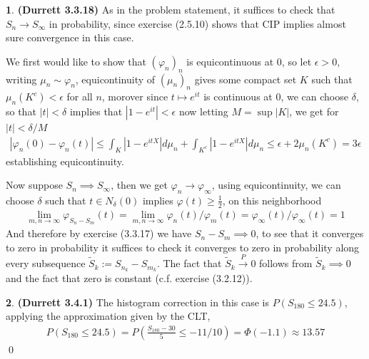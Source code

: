 \documentclass{article}
\theoremstyle{definition}
\newtheorem{pb}{}
\newcommand{\abs}[1]{\left\vert#1\right\vert}
\begin{document}
    \begin{pb}\textbf{(Durrett 3.3.18)}
        As in the problem statement, it suffices to check that \(S_n \to S_\infty\) in probability, since exercise (2.5.10) shows that CIP implies almost sure convergence in this case.

        We first would like to show that \((\varphi_n)_n\) is equicontinuous at \(0\), so let \(\epsilon > 0\), writing \(\mu_n \sim \varphi_n\), equicontinuity of \((\mu_n)_n\) gives some compact set \(K\) such that \(\mu_n(K^c) < \epsilon\) for all \(n\), morover since \(t \mapsto e^{it}\) is continuous at \(0\), we can choose \(\delta\), so that \(\abs{t} < \delta\) implies that \(\abs{1 - e^{it}} < \epsilon\) now letting \(M = \sup \abs{K}\), we get for \(\abs{t} < \delta/M\)
        \begin{align*}
            \abs{\varphi_n(0) - \varphi_n(t)} \leq \int_K \abs{1 - e^{itX}}d\mu_n + \int_{K^c} \abs{1 - e^{itX}}d\mu_n \leq \epsilon + 2\mu_n(K^c) = 3 \epsilon
        \end{align*}
        establishing equicontinuity.
        
        Now suppose \(S_n \implies S_\infty\), then we get \(\varphi_n \to \varphi_\infty\), using equicontinuity, we can choose \(\delta\) such that \(t \in N_\delta(0)\) implies \(\varphi(t) \geq \frac12\), on this neighborhood
        \begin{align*}
            \lim_{m,n\to\infty}\varphi_{S_n - S_m}(t) = \lim_{m,n \to \infty}\varphi_n(t)/\varphi_m(t) = \varphi_\infty(t)/\varphi_\infty(t) = 1
        \end{align*}
        And therefore by exercise (3.3.17) we have \(S_n - S_m \implies 0\), to see that it converges to zero in probability it suffices to check it converges to zero in probability along every subsequence \(\tilde{S}_k := S_{n_k} - S_{m_k}\). The fact that \(\tilde{S}_k \overset{P}{\to} 0\) follows from \(\tilde{S}_k \implies 0\) and the fact that zero is constant (c.f. exercise (3.2.12)).
    \end{pb}
    \begin{pb}\textbf{(Durrett 3.4.1)}
        The histogram correction in this case is \(P(S_{180} \leq 24.5)\), applying the approximation given by the CLT,
        \begin{align*}
            P(S_{180} \leq 24.5) = P\left(\frac{S_{180}-30}{5} \leq -11/10\right) = \Phi(-1.1) \approx 13.57
        \end{align*} \qed
    \end{pb}
\end{document}
